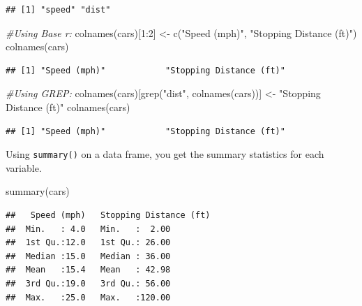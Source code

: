 \documentclass[
]{book}
\newenvironment{Shaded}{\begin{snugshade}}{\end{snugshade}}
\newcommand{\CommentTok}[1]{\textcolor[rgb]{0.56,0.35,0.01}{\textit{#1}}}
\newcommand{\DecValTok}[1]{\textcolor[rgb]{0.00,0.00,0.81}{#1}}
\newcommand{\FunctionTok}[1]{\textcolor[rgb]{0.00,0.00,0.00}{#1}}
\newcommand{\NormalTok}[1]{#1}
\newcommand{\OtherTok}[1]{\textcolor[rgb]{0.56,0.35,0.01}{#1}}
\newcommand{\SpecialCharTok}[1]{\textcolor[rgb]{0.00,0.00,0.00}{#1}}
\newcommand{\StringTok}[1]{\textcolor[rgb]{0.31,0.60,0.02}{#1}}
\theoremstyle{definition}
\theoremstyle{definition}
\theoremstyle{definition}
\theoremstyle{definition}
\theoremstyle{remark}
\begin{document}
\begin{verbatim}
## [1] "speed" "dist"
\end{verbatim}

\begin{Shaded}
\begin{Highlighting}[]
\CommentTok{\#Using Base r:}
\FunctionTok{colnames}\NormalTok{(cars)[}\DecValTok{1}\SpecialCharTok{:}\DecValTok{2}\NormalTok{] }\OtherTok{\textless{}{-}} \FunctionTok{c}\NormalTok{(}\StringTok{"Speed (mph)"}\NormalTok{, }\StringTok{"Stopping Distance (ft)"}\NormalTok{)}
\FunctionTok{colnames}\NormalTok{(cars)}
\end{Highlighting}
\end{Shaded}

\begin{verbatim}
## [1] "Speed (mph)"            "Stopping Distance (ft)"
\end{verbatim}

\begin{Shaded}
\begin{Highlighting}[]
\CommentTok{\#Using GREP:}
\FunctionTok{colnames}\NormalTok{(cars)[}\FunctionTok{grep}\NormalTok{(}\StringTok{"dist"}\NormalTok{, }\FunctionTok{colnames}\NormalTok{(cars))] }\OtherTok{\textless{}{-}} \StringTok{"Stopping Distance (ft)"}
\FunctionTok{colnames}\NormalTok{(cars)}
\end{Highlighting}
\end{Shaded}

\begin{verbatim}
## [1] "Speed (mph)"            "Stopping Distance (ft)"
\end{verbatim}

Using \texttt{summary()} on a data frame, you get the summary statistics for each variable.

\begin{Shaded}
\begin{Highlighting}[]
\FunctionTok{summary}\NormalTok{(cars)}
\end{Highlighting}
\end{Shaded}

\begin{verbatim}
##   Speed (mph)   Stopping Distance (ft)
##  Min.   : 4.0   Min.   :  2.00        
##  1st Qu.:12.0   1st Qu.: 26.00        
##  Median :15.0   Median : 36.00        
##  Mean   :15.4   Mean   : 42.98        
##  3rd Qu.:19.0   3rd Qu.: 56.00        
##  Max.   :25.0   Max.   :120.00
\end{verbatim}
\end{document}
